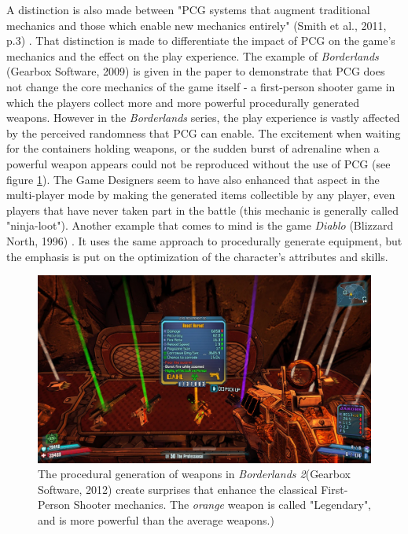 A distinction is also made between "PCG systems that augment traditional mechanics and those which enable new mechanics entirely" (Smith et al., 2011, p.3) \cite{pdf:pcgbased}. That distinction is made to differentiate the impact of PCG on the game's mechanics and the effect on the play experience. The example of \textit{Borderlands} (Gearbox Software, 2009) \cite{game:border} is given in the paper to demonstrate that PCG does not change the core mechanics of the game itself - a first-person shooter game in which the players collect more and more powerful procedurally generated weapons. However in the \textit{Borderlands} series, the play experience is vastly affected by the perceived randomness that PCG can enable. The excitement when waiting for the containers holding weapons, or the sudden burst of adrenaline when a powerful weapon appears could not be reproduced without the use of PCG (see figure \ref{fig:Bl2}). The Game Designers seem to have also enhanced that aspect in the multi-player mode by making the generated items collectible by any player, even players that have never taken part in the battle (this mechanic is generally called "ninja-loot"). Another example that comes to mind is the game \textit{Diablo} (Blizzard North, 1996) \cite{game:diablo}. It uses the same approach to procedurally generate equipment, but the emphasis is put on the optimization of the character's attributes and skills. 

\begin{figure}[!ht]
    \centering
    \includegraphics[scale=0.15]{Images/Borderlands2.jpg}
    \caption{The procedural generation of weapons in \textit{Borderlands 2}(Gearbox Software, 2012) create surprises that enhance the classical First-Person Shooter mechanics. The \textit{orange} weapon is called "Legendary", and is more powerful than the average weapons.)}
    \label{fig:Bl2}
\end{figure}


